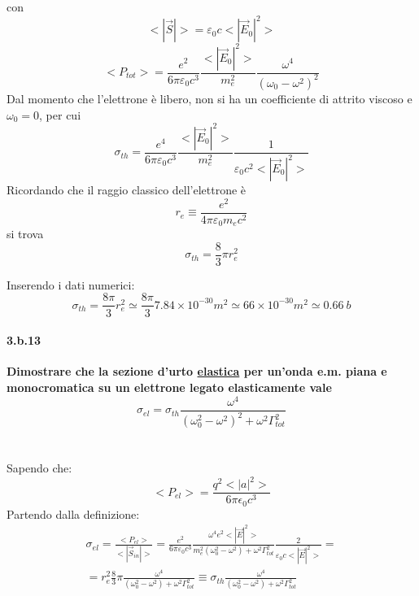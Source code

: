 \documentclass[twoside]{article}
\begin{document}
con
\begin{equation}
    <|\vec{S}|>=\varepsilon_0 c <|\vec{E}_0|^2>
\end{equation}
\begin{equation}
    <P_{tot}>=\frac{e^2}{6\pi \varepsilon_0 c^3}\frac{<|\vec{E}_0|^2>}{m_e^2}\frac{\omega^4}{(\omega_0-\omega^2)^2}
\end{equation}
Dal momento che l'elettrone è libero, non si ha un coefficiente di attrito viscoso e $\omega_0=0$, per cui
\begin{equation}
    \sigma_{th}=\frac{e^4}{6\pi \varepsilon_0 c^3}\frac{<|\vec{E}_0|^2>}{m_e^2}\frac{1}{\varepsilon_0 c^2 <|\vec{E}_0|^2>}
\end{equation}
Ricordando che il raggio classico dell'elettrone è 
\begin{equation}
    r_e\equiv \frac{e^2}{4\pi \varepsilon_0 m_e c^2}
\end{equation}
si trova
\begin{equation}
    \sigma_{th}=\frac{8}{3}\pi r_e^2
\end{equation}

Inserendo i dati numerici:
\begin{equation}
    \sigma_{th}=\frac{8\pi}{3}r_e^2\simeq\frac{8 \pi}{3}7.84 \times 10^{-30} m^2\simeq 66 \times 10^{-30} m^2\simeq 0.66 \ b
\end{equation}



\paragraph{3.b.13}\textbf{Dimostrare che la sezione d’urto \underline{elastica} per un’onda e.m. piana e
monocromatica su un elettrone legato elasticamente vale \begin{equation*}
    \sigma_{el}=\sigma_{th}\frac{\omega^4}{(\omega_0^2-\omega^2)^2+\omega^2\Gamma_{tot}^2}
\end{equation*}
}\\ \\
Sapendo che:
\begin{equation}
    <P_{el}>=\frac{q^2<|a|^2>}{6\pi \epsilon_0c^3}
\end{equation}
Partendo dalla definizione:
\begin{equation}\begin{split}
    \sigma_{el}=\frac{<P_{el}>}{<|\vec{S}_{in}|>}=\frac{e^2}{6\pi \varepsilon_0 c^3}\frac{\omega^4 e^2 <|\vec{E}|^2>}{m_e^2 (\omega_0^2-\omega^2)+\omega^2 \Gamma_{tot}^2}\frac{2}{\varepsilon_0 c <|\vec{E}|^2>}= \\ =r_e^2 \frac{8}{3}\pi \frac{\omega^4}{(\omega_0^2 -\omega^2)+\omega^2 \Gamma_{tot}^2}\equiv \sigma_{th}\frac{\omega^4}{(\omega_0^2 -\omega^2)+\omega^2 \Gamma_{tot}^2}
\end{split}\end{equation}
\end{document}
